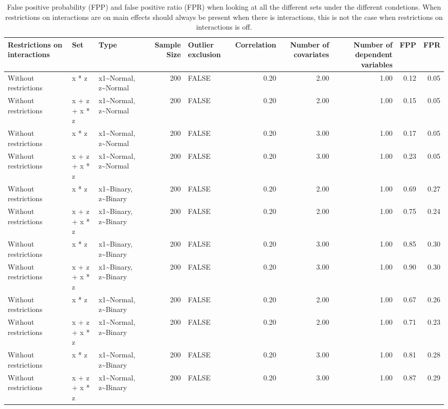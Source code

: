 \begin{longtable}{lllrlrrrrr}
\caption{False positive probability (FPP) and false positive ratio (FPR) when looking at all the different sets under the different condetions. When restrictions on interactions are on main effects should always be present when there is interactions, this is not the case when restrictions on interactions is off.} \\ 
  \hline
Restrictions on interactions & Set & Type & Sample Size & Outlier exclusion & Correlation & Number of covariates & Number of dependent variables & FPP & FPR \\ 
  \hline
Without restrictions & x * z & x1\~{}Normal, z\~{}Normal & 200 & FALSE & 0.20 & 2.00 & 1.00 & 0.12 & 0.05 \\ 
  Without restrictions & x + z + x * z & x1\~{}Normal, z\~{}Normal & 200 & FALSE & 0.20 & 2.00 & 1.00 & 0.15 & 0.05 \\ 
  Without restrictions & x * z & x1\~{}Normal, z\~{}Normal & 200 & FALSE & 0.20 & 3.00 & 1.00 & 0.17 & 0.05 \\ 
  Without restrictions & x + z + x * z & x1\~{}Normal, z\~{}Normal & 200 & FALSE & 0.20 & 3.00 & 1.00 & 0.23 & 0.05 \\ 
  Without restrictions & x * z & x1\~{}Binary, z\~{}Binary & 200 & FALSE & 0.20 & 2.00 & 1.00 & 0.69 & 0.27 \\ 
  Without restrictions & x + z + x * z & x1\~{}Binary, z\~{}Binary & 200 & FALSE & 0.20 & 2.00 & 1.00 & 0.75 & 0.24 \\ 
  Without restrictions & x * z & x1\~{}Binary, z\~{}Binary & 200 & FALSE & 0.20 & 3.00 & 1.00 & 0.85 & 0.30 \\ 
  Without restrictions & x + z + x * z & x1\~{}Binary, z\~{}Binary & 200 & FALSE & 0.20 & 3.00 & 1.00 & 0.90 & 0.30 \\ 
  Without restrictions & x * z & x1\~{}Normal, z\~{}Binary & 200 & FALSE & 0.20 & 2.00 & 1.00 & 0.67 & 0.26 \\ 
  Without restrictions & x + z + x * z & x1\~{}Normal, z\~{}Binary & 200 & FALSE & 0.20 & 2.00 & 1.00 & 0.71 & 0.23 \\ 
  Without restrictions & x * z & x1\~{}Normal, z\~{}Binary & 200 & FALSE & 0.20 & 3.00 & 1.00 & 0.81 & 0.28 \\ 
  Without restrictions & x + z + x * z & x1\~{}Normal, z\~{}Binary & 200 & FALSE & 0.20 & 3.00 & 1.00 & 0.87 & 0.29 \\ 

\end{longtable}
